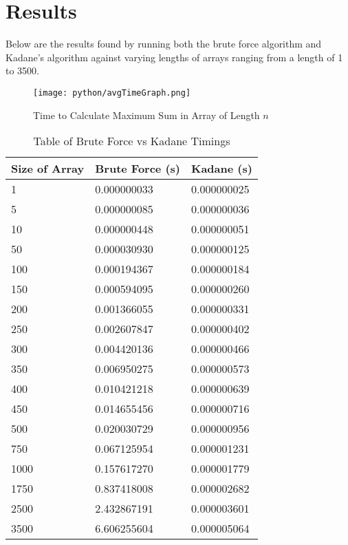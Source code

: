 \documentclass[10pt, letterpaper]{article}
\begin{document}
  \section{Results}

Below are the results found by running both the brute force algorithm and Kadane's algorithm against varying lengths of arrays ranging from a length of 1 to 3500.

	\begin{figure}[htbp]
		\begin{center}
			\texttt{[image: python/avgTimeGraph.png]}
			\caption{Time to Calculate Maximum Sum in Array of Length $n$}
			\label{fig:time-graph}
		\end{center}
	\end{figure}


\begin{table}[htb!]
	\begin{center}
	\caption{
		\label{fig:time-table} Table of Brute Force vs Kadane Timings}
	\medskip
	\begin{tabular}{ | p{2cm} | l | l | }
		\hline
		Size of Array & Brute Force (s) & Kadane (s) \\ \hline
		1 & 0.000000033 & 0.000000025 \\ \hline
		5 & 0.000000085 & 0.000000036 \\ \hline
		10 & 0.000000448 & 0.000000051 \\ \hline
		50 & 0.000030930 & 0.000000125 \\ \hline
		100 & 0.000194367 & 0.000000184 \\ \hline
		150 & 0.000594095 & 0.000000260 \\ \hline
		200 & 0.001366055 & 0.000000331 \\ \hline
		250 & 0.002607847 & 0.000000402 \\ \hline
		300 & 0.004420136 & 0.000000466 \\ \hline
		350 & 0.006950275 & 0.000000573 \\ \hline
		400 & 0.010421218 & 0.000000639 \\ \hline
		450 & 0.014655456 & 0.000000716 \\ \hline
		500 & 0.020030729 & 0.000000956 \\ \hline
		750 & 0.067125954 & 0.000001231 \\ \hline
		1000 & 0.157617270 & 0.000001779 \\ \hline
		1750 & 0.837418008 & 0.000002682 \\ \hline
		2500 & 2.432867191 & 0.000003601 \\ \hline
		3500 & 6.606255604 & 0.000005064 \\ \hline
	\end{tabular}
	\end{center}
\end{table}
\end{document}
